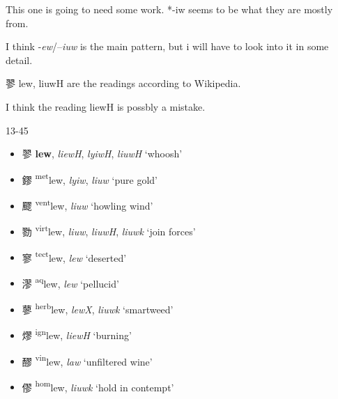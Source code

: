 This one is going to need some work. *-iw seems to be what they are mostly from. 

I think  -\textit{ew}/--\textit{iuw} is the main pattern, but i will have to look into it in some detail. 

翏 lew, liuwH are the readings according to Wikipedia. 

I think the reading liewH is possbly a mistake. 

13-45

\begin{itemize}
    \item {\Large{翏}}  %
    {\large{\textbf{lew}}},
    \textit{liewH}, \textit{lyiwH}, \textit{liuwH} `whoosh' %

    \item {\Large{鏐}}  %
    {\large{{\textsuperscript{met}}lew}},
    \textit{lyiw}, \textit{liuw} `pure gold' %

    \item {\Large{飂}}  %
    {\large{{\textsuperscript{vent}}lew}},
    \textit{liuw} `howling wind' %
    
    \item {\Large{勠}}  %
    {\large{{\textsuperscript{virt}}lew}},
    \textit{liuw}, \textit{liuwH}, \textit{liuwk} `join forces' %

    \item {\Large{寥}}  %
    {\large{{\textsuperscript{tect}}lew}},
    \textit{lew} `deserted' %

    \item {\Large{漻}}  %
    {\large{{\textsuperscript{aq}}lew}},
    \textit{lew} `pellucid' %

    \item {\Large{蓼}}  %
    {\large{{\textsuperscript{herb}}lew}},
    \textit{lewX}, \textit{liuwk} `smartweed' %

    \item {\Large{熮}}  %
    {\large{{\textsuperscript{ign}}lew}},
    \textit{liewH} `burning' %

    \item {\Large{醪}}  %
    {\large{{\textsuperscript{vin}}lew}},
    \textit{law} `unfiltered wine' %

    \item {\Large{僇}}  %
    {\large{{\textsuperscript{hom}}lew}},
    \textit{liuwk} `hold in contempt' %


\end{itemize}
